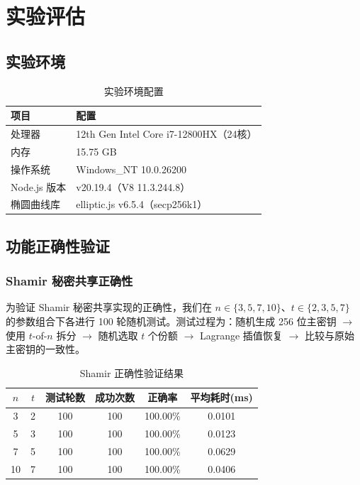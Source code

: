 \section{实验评估}

\subsection{实验环境}

\begin{table}[H]
    \centering
    \caption{实验环境配置}
    \label{tab:env}
    \begin{tabularx}{\textwidth}{lX}
        \toprule
        \textbf{项目} & \textbf{配置} \\
        \midrule
        处理器 & 12th Gen Intel Core i7-12800HX（24核） \\
        内存 & 15.75 GB \\
        操作系统 & Windows\_NT 10.0.26200 \\
        Node.js 版本 & v20.19.4（V8 11.3.244.8） \\
        椭圆曲线库 & elliptic.js v6.5.4（secp256k1） \\
        \bottomrule
    \end{tabularx}
\end{table}

\subsection{功能正确性验证}

\subsubsection{Shamir 秘密共享正确性}

为验证 Shamir 秘密共享实现的正确性，我们在 $n \in \{3, 5, 7, 10\}$、$t \in \{2, 3, 5, 7\}$ 的参数组合下各进行 100 轮随机测试。测试过程为：随机生成 256 位主密钥 $\rightarrow$ 使用 $t$-of-$n$ 拆分 $\rightarrow$ 随机选取 $t$ 个份额 $\rightarrow$ Lagrange 插值恢复 $\rightarrow$ 比较与原始主密钥的一致性。

\begin{table}[H]
    \centering
    \caption{Shamir 正确性验证结果}
    \label{tab:shamir_test}
    \begin{tabularx}{\textwidth}{cccccc}
        \toprule
        $n$ & $t$ & 测试轮数 & 成功次数 & 正确率 & 平均耗时(ms) \\
        \midrule
        3 & 2 & 100 & 100 & 100.00\% & 0.0101 \\
        5 & 3 & 100 & 100 & 100.00\% & 0.0123 \\
        7 & 5 & 100 & 100 & 100.00\% & 0.0629 \\
        10 & 7 & 100 & 100 & 100.00\% & 0.0406 \\
        \bottomrule
    \end{tabularx}
\end{table}

